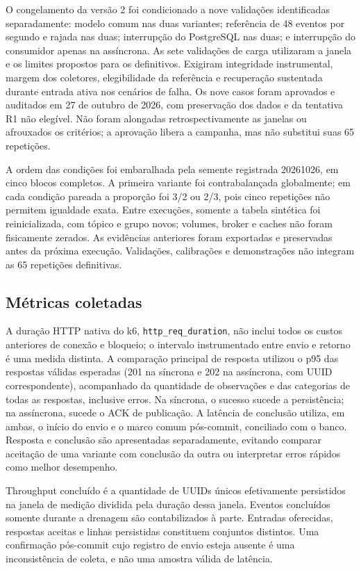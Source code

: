 O congelamento da versão 2 foi condicionado a nove validações identificadas separadamente: modelo comum nas duas variantes; referência de 48 eventos por segundo e rajada nas duas; interrupção do PostgreSQL nas duas; e interrupção do consumidor apenas na assíncrona. As sete validações de carga utilizaram a janela e os limites propostos para os definitivos. Exigiram integridade instrumental, margem dos coletores, elegibilidade da referência e recuperação sustentada durante entrada ativa nos cenários de falha. Os nove casos foram aprovados e auditados em 27 de outubro de 2026, com preservação dos dados e da tentativa R1 não elegível. Não foram alongadas retrospectivamente as janelas ou afrouxados os critérios; a aprovação libera a campanha, mas não substitui suas 65 repetições.

A ordem das condições foi embaralhada pela semente registrada 20261026, em cinco blocos completos. A primeira variante foi contrabalançada globalmente; em cada condição pareada a proporção foi 3/2 ou 2/3, pois cinco repetições não permitem igualdade exata. Entre execuções, somente a tabela sintética foi reinicializada, com tópico e grupo novos; volumes, broker e caches não foram fisicamente zerados. As evidências anteriores foram exportadas e preservadas antes da próxima execução. Validações, calibrações e demonstrações não integram as 65 repetições definitivas.

\subsection{Métricas coletadas}
A duração HTTP nativa do k6, \texttt{http\_req\_duration}, não inclui todos os custos anteriores de conexão e bloqueio; o intervalo instrumentado entre envio e retorno é uma medida distinta. A comparação principal de resposta utilizou o p95 das respostas válidas esperadas (201 na síncrona e 202 na assíncrona, com UUID correspondente), acompanhado da quantidade de observações e das categorias de todas as respostas, inclusive erros. Na síncrona, o sucesso sucede a persistência; na assíncrona, sucede o ACK de publicação. A latência de conclusão utiliza, em ambas, o início do envio e o marco comum pós-commit, conciliado com o banco. Resposta e conclusão são apresentadas separadamente, evitando comparar aceitação de uma variante com conclusão da outra ou interpretar erros rápidos como melhor desempenho.

Throughput concluído é a quantidade de UUIDs únicos efetivamente persistidos na janela de medição dividida pela duração dessa janela. Eventos concluídos somente durante a drenagem são contabilizados à parte. Entradas oferecidas, respostas aceitas e linhas persistidas constituem conjuntos distintos. Uma confirmação pós-commit cujo registro de envio esteja ausente é uma inconsistência de coleta, e não uma amostra válida de latência.

